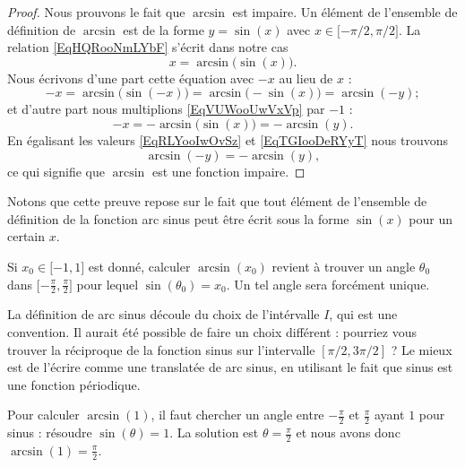 \begin{proof}
    Nous prouvons le fait que \( \arcsin\) est impaire. Un élément de l'ensemble de définition de \( \arcsin\) est de la forme \( y=\sin(x)\) avec \( x\in\mathopen[ -\pi/2 , \pi/2 \mathclose]\). La relation \eqref{EqHQRooNmLYbF} s'écrit dans notre cas
    \begin{equation}    \label{EqVUWooUwVxVp}
        x=\arcsin\big( \sin(x) \big).
    \end{equation}
    Nous écrivons d'une part cette équation avec \( -x\) au lieu de \( x\) :
    \begin{equation}    \label{EqRLYooIwOvSz}
        -x=\arcsin\big( \sin(-x) \big)=\arcsin\big( -\sin(x) \big)=\arcsin(-y);
    \end{equation}
    et d'autre part nous multiplions \eqref{EqVUWooUwVxVp} par \( -1\) :
    \begin{equation}    \label{EqTGIooDeRYyT}
        -x=-\arcsin\big( \sin(x) \big)=-\arcsin(y).
    \end{equation}
    En égalisant les valeurs \eqref{EqRLYooIwOvSz} et \eqref{EqTGIooDeRYyT} nous trouvons
    \begin{equation}
        \arcsin(-y)=-\arcsin(y),
    \end{equation}
    ce qui signifie que \( \arcsin\) est une fonction impaire.
\end{proof}
Notons que cette preuve repose sur le fait que tout élément de l'ensemble de définition de la fonction arc sinus peut être écrit sous la forme \( \sin(x)\) pour un certain \( x\).

Si \( x_0\in\mathopen[ -1 , 1 \mathclose]\) est donné, calculer \( \arcsin(x_0)\) revient à trouver un angle \( \theta_0\) dans \( \mathopen[ -\frac{ \pi }{2} , \frac{ \pi }{2} \mathclose]\) pour lequel \( \sin(\theta_0)=x_0\). Un tel angle sera forcément unique.

\begin{remark}
  La définition de arc sinus découle du choix de l'intérvalle $I$, qui est une convention. Il aurait été possible de faire un choix différent : pourriez vous trouver la réciproque de la fonction sinus sur l'intervalle $[\pi/2, 3\pi/2]$ ? Le mieux est de l'écrire comme une translatée de arc sinus, en utilisant le fait que sinus est une fonction périodique. 
\end{remark}

\begin{example}
    Pour calculer \( \arcsin(1)\), il faut chercher un angle entre \( -\frac{ \pi }{2}\) et \( \frac{ \pi }{ 2 }\) ayant \( 1\) pour sinus : résoudre \( \sin(\theta)=1\). La solution est \( \theta=\frac{ \pi }{2}\) et nous avons donc \( \arcsin(1)=\frac{ \pi }{2}\).
\end{example}

